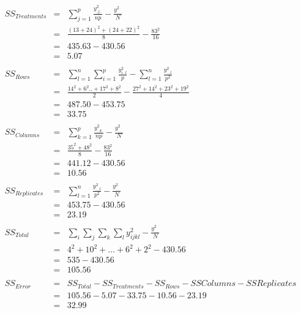 \begin{eqnarray*}
SS_{Treatments} & = & \sum_{j=1}^p \frac{y_{.j..}^2}{np}- \frac{y_{....}^2}{N}\\
                 & = & \frac{(13 + 24)^2 + (24 + 22)^2}{8} - \frac{83^2}{16}\\
                 & = & 435.63 - 430.56 \\
                 & = & 5.07\\
                 &   &\\
SS_{Rows} & = & \sum_{l=1}^n \sum_{i=1}^p \frac{y_{i..l}^2}{p}-\sum_{l=1}^n \frac{y_{...l}^2}{p^2}\\
          & = & \frac{14^2+6^2..+17^2+8^2}{2} - \frac{27^2+14^2+23^2+19^2}{4}\\
          & = & 487.50 - 453.75 \\
          & = & 33.75 \\
          &   &\\
SS_{Columns} & = & \sum_{k=1}^p \frac{y_{..k.}^2}{np} -  \frac{y_{....}^2}{N}\\
             & = & \frac{35^2+48^2}{8} - \frac{83^2}{16}\\
             & = & 441.12 - 430.56 \\
             & = & 10.56\\
             &   &\\
SS_{Replicates} & = & \sum_{l=1}^n \frac{y_{...l}^2}{p^2} - \frac{y_{....}^2}{N}\\
                & = & 453.75 - 430.56 \\
                & = & 23.19\\
                &   &\\
SS_{Total} & = & \sum_i \sum_j \sum_k \sum_l y_{ijkl}^2 - \frac{y_{....}^2}{N}\\
           & = & 4^2+10^2+...+6^2+2^2 - 430.56 \\
           & = & 535 - 430.56 \\
           & = & 105.56\\
           &   &\\
SS_{Error} & = & SS_{Total}-SS_{Treatments}-SS_{Rows}-SS{Columns}-SS{Replicates}\\
           & = & 105.56 - 5.07 - 33.75 - 10.56 - 23.19 \\
           & = & 32.99
\end{eqnarray*}



